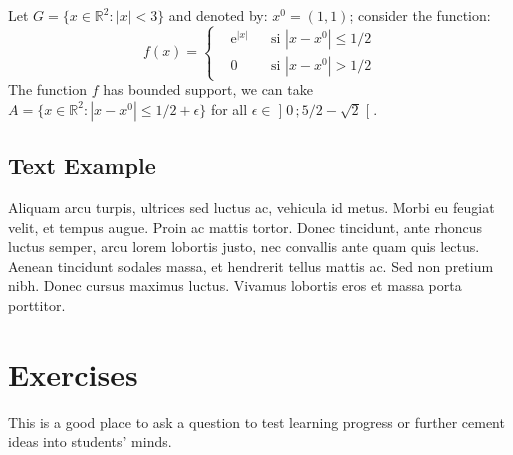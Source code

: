 \documentclass[
	11pt,
	fleqn,
	a4paper,
]{LegrandOrangeBook}
\begin{document}
\begin{example} %
    Let $G=\{x\in\mathbb{R}^2:|x|<3\}$ and denoted by: $x^0=(1,1)$; consider the function:
    \begin{equation}
        f(x)=\left\{\begin{aligned}                                                                                                                                                                                              & \mathrm{e}^{|x|} &  & \text{si $|x-x^0|\leq 1/2$} \\
                                                                                                                                                                                                             & 0                &  & \text{si $|x-x^0|> 1/2$}\end{aligned}\right.
    \end{equation}
    The function $f$ has bounded support, we can take $A=\{x\in\mathbb{R}^2:|x-x^0|\leq 1/2+\epsilon\}$ for all $\epsilon\in\mathopen{]}0\,;5/2-\sqrt{2}\mathclose{[}$.
\end{example}

\subsection{Text Example}

\begin{example}[Example name] %
    Aliquam arcu turpis, ultrices sed luctus ac, vehicula id metus. Morbi eu feugiat velit, et tempus augue. Proin ac mattis tortor. Donec tincidunt, ante rhoncus luctus semper, arcu lorem lobortis justo, nec convallis ante quam quis lectus. Aenean tincidunt sodales massa, et hendrerit tellus mattis ac. Sed non pretium nibh. Donec cursus maximus luctus. Vivamus lobortis eros et massa porta porttitor.
\end{example}


\section{Exercises}

\begin{exercise} %
    This is a good place to ask a question to test learning progress or further cement ideas into students' minds.
\end{exercise}
\end{document}
